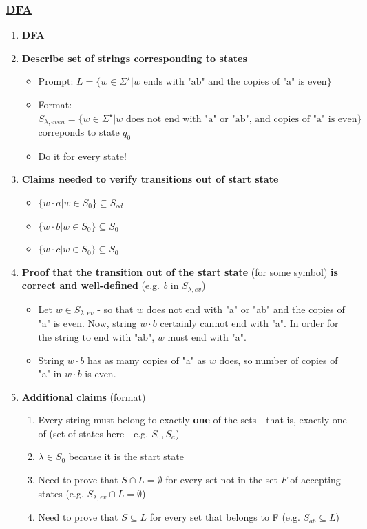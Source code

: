 \documentclass[8pt]{extarticle}
\begin{document}
\subsubsection*{\underline{DFA}}
\begin{enumerate}[label=(\alph*)]
    \item \textbf{DFA}
    \item \textbf{Describe set of strings corresponding to states}
    \begin{itemize}
        \item Prompt: $L=\{w\in\Sigma^\star|\text{$w$ ends with "ab" and the copies of "a" is even}\}$
        \item Format: $S_{\lambda,even}=\{w\in\Sigma^\star|\text{$w$ does not end with "a" or "ab", and copies of "a" is even}\}$
        correponds to state $q_0$
        \item Do it for every state!
    \end{itemize}
    \item \textbf{Claims needed to verify transitions out of start state}
    \begin{itemize}
        \item $\{w\cdot a|w\in S_0\}\subseteq S_{od}$
        \item $\{w\cdot b|w\in S_0\}\subseteq S_0$
        \item $\{w\cdot c|w\in S_0\}\subseteq S_0$
    \end{itemize}
    \item \textbf{Proof that the transition out of the start state} (for some symbol) 
    \textbf{is correct and well-defined} (e.g. \textit{b} in $S_{\lambda,ev}$)
    \begin{itemize}
        \item Let $w\in S_{\lambda,ev}$ - so that $w$ does not end with "a" or "ab" and the copies 
        of "a" is even. Now, string $w\cdot b$ certainly cannot end with "a". In order for the string 
        to end with "ab", $w$ must end with "a".
        \item String $w\cdot b$ has as many copies of "a" as $w$ does, so number of copies of "a" in
        $w\cdot b$ is even. 
    \end{itemize}
    \item \textbf{Additional claims} (format)
    \begin{enumerate}[label=(\roman*)]
        \item Every string must belong to exactly \textbf{one} of the sets - that is, exactly one of
        (set of states here - e.g. $S_0, S_a$)
        \item $\lambda\in S_0$ because it is the start state
        \item Need to prove that $S\cap L=\emptyset$ for every set not in the set $F$ of accepting states (e.g. $S_{\lambda,ev}\cap L=\emptyset$)
        \item Need to prove that $S\subseteq L$ for every set that belongs to F (e.g. $S_{ab}\subseteq L$)
    \end{enumerate}

\end{enumerate}
\end{document}
